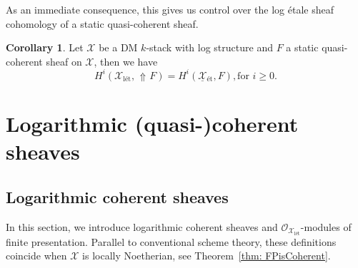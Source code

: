 \documentclass[11pt]{amsart}
\theoremstyle{definition}
\theoremstyle{definition}
\newtheorem{corollary}[theorem]{Corollary}
\DeclareMathOperator{\arrowup}{\!\Uparrow \!}
\newcommand{\cO}{\mathcal{O}}
\newcommand{\cX}{\mathcal{X}}
\newcommand{\ul}[1]{\underline{#1}}
\newcommand{\cal}{\mathcal}
\def\cO{{\cal O}}
\def\cX{{\cal X}}
\begin{document}
As an immediate consequence, this gives us control over the log \'etale sheaf cohomology of a static quasi-coherent sheaf.
\begin{corollary}\label{corollary-sheaf-cohomology-of-static-sheaves}
Let $\mathcal{X}$ be a DM $k$-stack with log structure and $F$ a static quasi-coherent sheaf on $\mathcal{X}$, then we have
\[H^{i}(\mathcal{X}_{\text{l\'et}},\arrowup F)=H^{i}(\ul{\mathcal{X}}{}_{\text{\'et}},F), \text{for }i\geq 0.\]
\end{corollary}
\section{Logarithmic (quasi-)coherent sheaves}\label{sec:LogCoherentSheaves}

\subsection{Logarithmic coherent sheaves}\label{sec:coherent sheaves}
In this section, we introduce logarithmic coherent sheaves and $\cO_{\cX_{\text{l\'et}}}$-modules of finite presentation. Parallel to conventional scheme theory, these definitions coincide when $\mathcal{X}$ is locally Noetherian, see Theorem~\ref{thm: FPisCoherent}.
\end{document}
